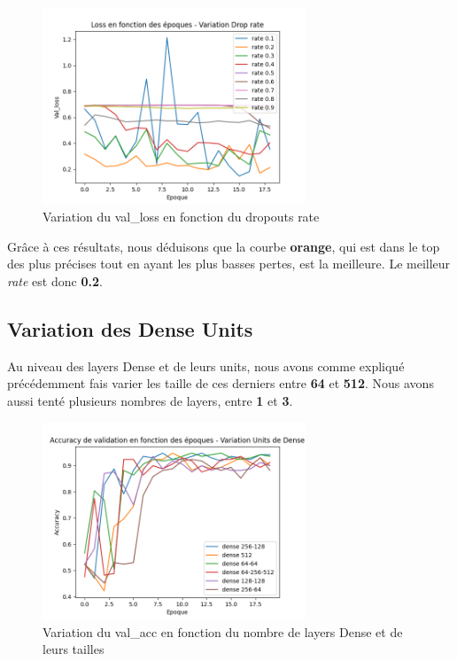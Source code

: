 \documentclass{rapport}
\begin{document}
        \begin{figure}[H]
            \centering
            \includegraphics[width=0.7\textwidth]{rapport/plots/dropout_loss.png}
            \caption{Variation du val\_loss en fonction du dropouts rate}
            \label{fig:mesh2}
        \end{figure}
        
        Grâce à ces résultats, nous déduisons que la courbe \textbf{orange}, qui est dans le top des plus précises tout en ayant les plus basses pertes, est la meilleure. Le meilleur \textit{rate} est donc \textbf{0.2}.
        
        \subsection{Variation des Dense Units}
        Au niveau des layers Dense et de leurs units, nous avons comme expliqué précédemment fais varier les taille de ces derniers entre \textbf{64} et \textbf{512}. Nous avons aussi tenté plusieurs nombres de layers, entre \textbf{1} et \textbf{3}.
        
        \begin{figure}[H]
            \centering
            \includegraphics[width=0.7\textwidth]{rapport/plots/dense_acc.png}
            \caption{Variation du val\_acc en fonction du nombre de layers Dense et de leurs tailles}
            \label{fig:mesh1}
        \end{figure}
\end{document}

